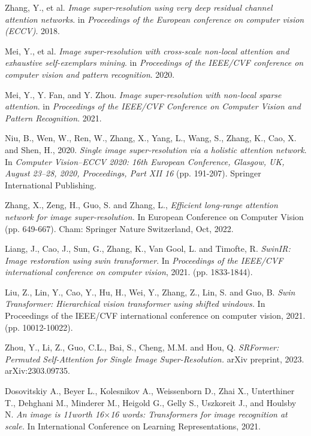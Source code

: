 \documentclass[journal]{IEEEtran}
\begin{document}
\begin{thebibliography}{00}
 Zhang, Y., et al. \textit{Image super-resolution using very deep residual channel attention networks}. in \textit{Proceedings of the European conference on computer vision (ECCV)}. 2018.

 Mei, Y., et al. \textit{Image super-resolution with cross-scale non-local attention and exhaustive self-exemplars mining}. in \textit{Proceedings of the IEEE/CVF conference on computer vision and pattern recognition}. 2020.

 Mei, Y., Y. Fan, and Y. Zhou. \textit{Image super-resolution with non-local sparse attention}. in \textit{Proceedings of the IEEE/CVF Conference on Computer Vision and Pattern Recognition}. 2021.

 Niu, B., Wen, W., Ren, W., Zhang, X., Yang, L., Wang, S., Zhang, K., Cao, X. and Shen, H., 2020. \textit{Single image super-resolution via a holistic attention network}. In \textit{Computer Vision–ECCV 2020: 16th European Conference, Glasgow, UK, August 23–28, 2020, Proceedings, Part XII 16} (pp. 191-207). Springer International Publishing.

 Zhang, X., Zeng, H., Guo, S. and Zhang, L., \textit{Efficient long-range attention network for image super-resolution.} In European Conference on Computer Vision (pp. 649-667). Cham: Springer Nature Switzerland, Oct, 2022.

 Liang, J., Cao, J., Sun, G., Zhang, K., Van Gool, L. and Timofte, R. \textit{SwinIR: Image restoration using swin transformer}. In \textit{Proceedings of the IEEE/CVF international conference on computer vision}, 2021. (pp. 1833-1844).

 Liu, Z., Lin, Y., Cao, Y., Hu, H., Wei, Y., Zhang, Z., Lin, S. and Guo, B. \textit{Swin Transformer: Hierarchical vision transformer using shifted windows.} In Proceedings of the IEEE/CVF international conference on computer vision, 2021. (pp. 10012-10022).

 Zhou, Y., Li, Z., Guo, C.L., Bai, S., Cheng, M.M. and Hou, Q. \textit{SRFormer: Permuted Self-Attention for Single Image Super-Resolution.} arXiv preprint, 2023. arXiv:2303.09735.

 Dosovitskiy A., Beyer L., Kolesnikov A., Weissenborn D., Zhai X., Unterthiner T., Dehghani M., Minderer M., Heigold G., Gelly S., Uszkoreit J., and Houlsby N. \textit{An image is 11worth 16$\times$16 words: Transformers for image recognition at scale.} In International Conference on Learning Representations, 2021.


\end{thebibliography}
\end{document}

